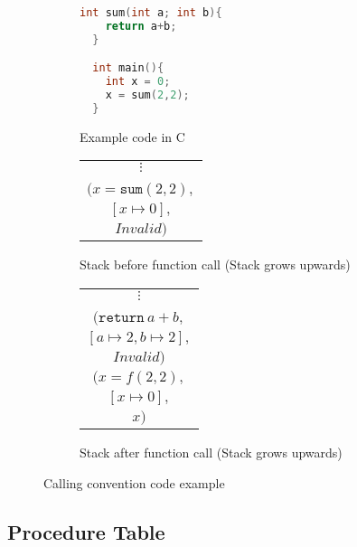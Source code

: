 \begin{figure}
  \begin{subfigure}{0.3\textwidth}
  \begin{lstlisting}[language=c, mathescape=true]
  int sum(int a; int b){
    return a+b;
  }

  int main(){
    int x = 0;
    x = sum(2,2);
  }
  \end{lstlisting}
  \caption{Example code in C}
  \label{fig:stack_ex_c_code}
  \end{subfigure}
  \begin{subfigure}{0.3\textwidth}
    \begin{tabular}{|c|}
      \hline
      \hline
      $\vdots$ \\
      \\
      \hline
      $(x = \mathtt{sum}(2,2),$ \\
      $[x \mapsto 0],$ \\
      $ Invalid )$ \\
      \hline \hline
    \end{tabular}
  \caption{Stack before function call (Stack grows upwards)}
  \label{fig:stack_bef_fun_call}
  \end{subfigure}
  \begin{subfigure}{0.3\textwidth}
    \begin{tabular}{|c|}
      \hline
      \hline
      $\vdots$ \\
      \\
      \hline
      $(\mathtt{return}\ a+b,$ \\
      $[a \mapsto 2, b \mapsto 2],$ \\
      $ Invalid )$ \\
      \hline
      $(x = f(2,2),$ \\
      $[x \mapsto 0],$ \\
      $ x )$ \\
      \hline \hline
    \end{tabular}
  \caption{Stack after function call (Stack grows upwards)}
  \label{fig:stack_aft_fun_call}
  \end{subfigure}

  \caption{Calling convention code example}
  \label{fig:stack_example}
\end{figure}


\subsection{Procedure Table}\label{subsection:procedure_table}

